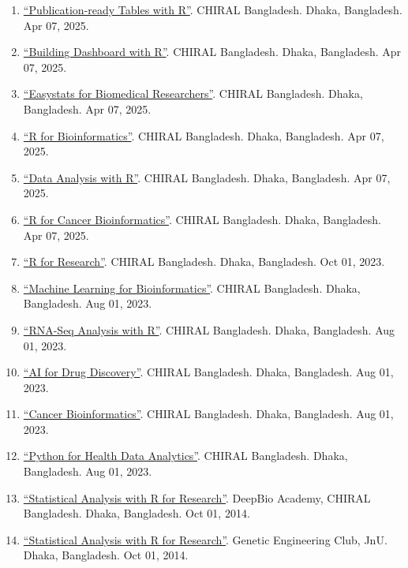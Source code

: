 \documentclass[
  11pt,
  letterpaper,
  DIV=11,
  numbers=noendperiod]{scrartcl}
\providecommand{\tightlist}{%
  \setlength{\itemsep}{0pt}\setlength{\parskip}{0pt}}
\begin{document}
\begin{enumerate}
\def\labelenumi{\arabic{enumi}.}
\tightlist
\item
  \href{https://deepbioacademy.github.io/gtsummary/}{``Publication-ready
  Tables with R''}. CHIRAL Bangladesh. Dhaka, Bangladesh. Apr 07, 2025.
\item
  \href{https://deepbioacademy.github.io/BuildingDashboardwithR/}{``Building
  Dashboard with R''}. CHIRAL Bangladesh. Dhaka, Bangladesh. Apr 07,
  2025.
\item
  \href{https://deepbioacademy.github.io/easystats/}{``Easystats for
  Biomedical Researchers''}. CHIRAL Bangladesh. Dhaka, Bangladesh. Apr
  07, 2025.
\item
  \href{https://deepbioacademy.github.io/RforBioinformatics/}{``R for
  Bioinformatics''}. CHIRAL Bangladesh. Dhaka, Bangladesh. Apr 07, 2025.
\item
  \href{https://deepbioacademy.github.io/DataAnalysiswithR/}{``Data
  Analysis with R''}. CHIRAL Bangladesh. Dhaka, Bangladesh. Apr 07,
  2025.
\item
  \href{https://deepbioacademy.github.io/panomics/}{``R for Cancer
  Bioinformatics''}. CHIRAL Bangladesh. Dhaka, Bangladesh. Apr 07, 2025.
\item
  \href{https://www.youtube.com/playlist?list=PLQtDkvtE4BUa05wsFn5OWHEapIiSEYp7T}{``R
  for Research''}. CHIRAL Bangladesh. Dhaka, Bangladesh. Oct 01, 2023.
\item
  \href{https://www.youtube.com/playlist?list=PLQtDkvtE4BUaCZuWpLiM5bV5--gjuY5ZI}{``Machine
  Learning for Bioinformatics''}. CHIRAL Bangladesh. Dhaka, Bangladesh.
  Aug 01, 2023.
\item
  \href{https://www.youtube.com/playlist?list=PLQtDkvtE4BUZUHltq6DJ5KGrncv0gn_Zj}{``RNA-Seq
  Analysis with R''}. CHIRAL Bangladesh. Dhaka, Bangladesh. Aug 01,
  2023.
\item
  \href{https://www.youtube.com/playlist?list=PLQtDkvtE4BUYu0_nHZ4m9JcSHtLbJ_HUM}{``AI
  for Drug Discovery''}. CHIRAL Bangladesh. Dhaka, Bangladesh. Aug 01,
  2023.
\item
  \href{https://www.youtube.com/playlist?list=PLQtDkvtE4BUazUbCqCGNrsziV2heHcR2V}{``Cancer
  Bioinformatics''}. CHIRAL Bangladesh. Dhaka, Bangladesh. Aug 01, 2023.
\item
  \href{https://www.youtube.com/playlist?list=PLQtDkvtE4BUYqRQa6Lev4NFg5MJ4fuKsw}{``Python
  for Health Data Analytics''}. CHIRAL Bangladesh. Dhaka, Bangladesh.
  Aug 01, 2023.
\item
  \href{https://mdjubayerhossain.com/SAR/}{``Statistical Analysis with R
  for Research''}. DeepBio Academy, CHIRAL Bangladesh. Dhaka,
  Bangladesh. Oct 01, 2014.
\item
  \href{https://mdjubayerhossain.com/SAR/}{``Statistical Analysis with R
  for Research''}. Genetic Engineering Club, JnU. Dhaka, Bangladesh. Oct
  01, 2014.
\end{enumerate}
\end{document}
